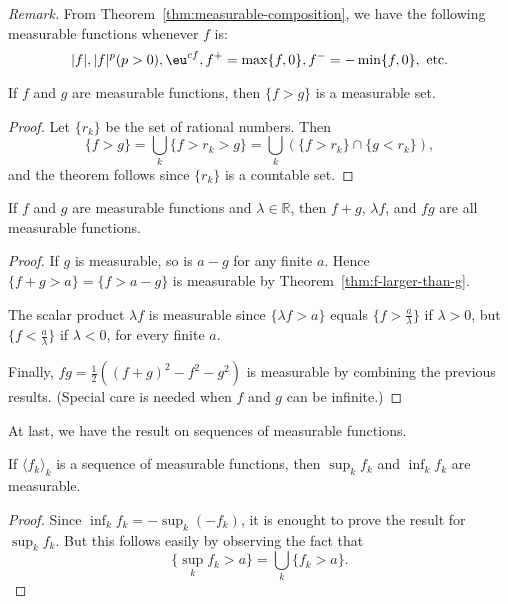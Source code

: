 \documentclass[11pt]{article}
\begin{document}
\noindent\textit{Remark.} From Theorem~\ref{thm:measurable-composition}, we have the following measurable functions whenever $f$ is:
\[
  |f|, |f|^p (p>0), \eu^{cf}, f^+=\max\{f,0\}, f^-=-\min\{f,0\}, \text{ etc.}
\]

\begin{thm}
  \label{thm:f-larger-than-g}
  If $f$ and $g$ are measurable functions, then $\{ f > g \}$ is a measurable set.
\end{thm}

\begin{proof}
  Let $\{ r_k \}$ be the set of rational numbers.  Then
  \[
    \{ f > g \} = \bigcup_k \{ f > r_k > g \} = \bigcup_k \left( \{ f > r_k \} \cap \{ g < r_k \} \right),
  \]
  and the theorem follows since $\{ r_k \}$ is a countable set.
\end{proof}

\begin{thm}
  If $f$ and $g$ are measurable functions and $\lambda \in \mathbb{R}$, then $f+g$, $\lambda f$, and $fg$ are all measurable functions.
\end{thm}

\begin{proof}
  If $g$ is measurable, so is $a - g$ for any finite $a$.  Hence $\{ f + g > a \} = \{ f > a - g \}$ is measurable by Theorem~\ref{thm:f-larger-than-g}.  

  The scalar product $\lambda f$ is measurable since $\{ \lambda f > a \}$ equals $\{ f > \frac{a}{\lambda} \}$ if $\lambda > 0$, but $\{ f < \frac{a}{\lambda} \}$ if $\lambda < 0$, for every finite $a$.

  Finally, $fg = \frac{1}{2} ( (f+g)^2 - f^2 - g^2 )$ is measurable by combining the previous results.  (Special care is needed when $f$ and $g$ can be infinite.)
\end{proof}

At last, we have the result on sequences of measurable functions.

\begin{thm}
  \label{thm:measurable-sup-inf}
  If $\langle f_k \rangle_k$ is a sequence of measurable functions, then $\sup_k f_k$ and $\inf_k f_k$ are measurable.
\end{thm}

\begin{proof}
  Since $\inf_k f_k = - \sup_k (-f_k)$, it is enought to prove the result for $\sup_k f_k$.  But this follows easily by observing the fact that
  \[
    \{ \sup_k f_k > a \} = \bigcup_k \{ f_k > a \}.
  \]
\end{proof}
\end{document}
